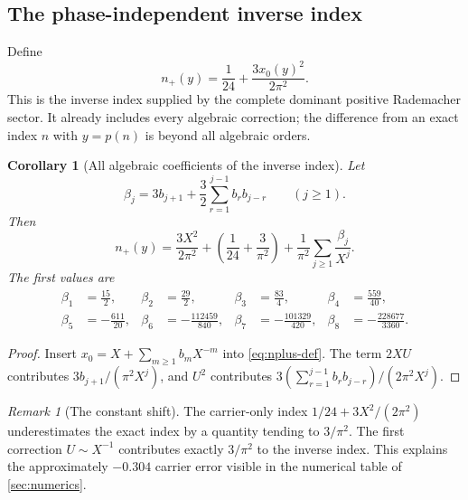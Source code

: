 \documentclass[11pt,a4paper]{article}
\numberwithin{equation}{section}
\newtheorem{corollary}[theorem]{Corollary}
\theoremstyle{remark}
\newtheorem{remark}[theorem]{Remark}
\begin{document}
\subsection{The phase-independent inverse index}

Define
\begin{equation}\label{eq:nplus-def}
 n_+(y)=\frac1{24}+\frac{3x_0(y)^2}{2\pi^2}.
\end{equation}
This is the inverse index supplied by the complete dominant positive Rademacher sector.  It already includes every algebraic correction; the difference from an exact index $n$ with $y=p(n)$ is beyond all algebraic orders.

\begin{corollary}[All algebraic coefficients of the inverse index]\label{cor:nplus-expansion}
Let
\begin{equation}\label{eq:beta-def}
 \beta_j=3b_{j+1}+\frac32\sum_{r=1}^{j-1}b_rb_{j-r}
 \qquad(j\ge1).
\end{equation}
Then
\begin{equation}\label{eq:nplus-expansion}
 \boxed{
 n_+(y)=\frac{3X^2}{2\pi^2}
 +\left(\frac1{24}+\frac3{\pi^2}\right)
 +\frac1{\pi^2}\sum_{j\ge1}\frac{\beta_j}{X^j}.}
\end{equation}
The first values are
\begin{align}
 \beta_1&=\frac{15}{2},&
 \beta_2&=\frac{29}{2},&
 \beta_3&=\frac{83}{4},&
 \beta_4&=\frac{559}{40},\nonumber\\
 \beta_5&=-\frac{611}{20},&
 \beta_6&=-\frac{112459}{840},&
 \beta_7&=-\frac{101329}{420},&
 \beta_8&=-\frac{228677}{3360}.\label{eq:beta-first}
\end{align}
\end{corollary}

\begin{proof}
Insert $x_0=X+\sum_{m\ge1}b_mX^{-m}$ into \cref{eq:nplus-def}.  The term $2XU$ contributes $3b_{j+1}/(\pi^2X^j)$, and $U^2$ contributes
$3(\sum_{r=1}^{j-1}b_rb_{j-r})/(2\pi^2X^j)$.
\end{proof}

\begin{remark}[The constant shift]
The carrier-only index
$1/24+3X^2/(2\pi^2)$ underestimates the exact index by a quantity tending to $3/\pi^2$.  The first correction $U\sim X^{-1}$ contributes exactly $3/\pi^2$ to the inverse index.  This explains the approximately $-0.304$ carrier error visible in the numerical table of \cref{sec:numerics}.
\end{remark}
\end{document}
